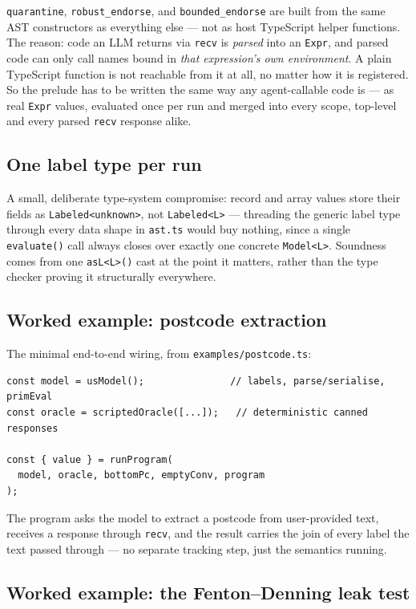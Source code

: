 \documentclass[11pt, a4paper]{article}
\begin{document}
\lstinline{quarantine}, \lstinline{robust_endorse}, and
\lstinline{bounded_endorse} are built from the same AST constructors as
everything else --- not as host TypeScript helper functions. The reason:
code an LLM returns via \lstinline{recv} is \emph{parsed} into an
\lstinline{Expr}, and parsed code can only call names bound in \emph{that
expression's own environment}. A plain TypeScript function is not
reachable from it at all, no matter how it is registered. So the prelude
has to be written the same way any agent-callable code is --- as real
\lstinline{Expr} values, evaluated once per run and merged into every
scope, top-level and every parsed \lstinline{recv} response alike.

\subsection{One label type per run}

A small, deliberate type-system compromise: record and array values store
their fields as \lstinline{Labeled<unknown>}, not \lstinline{Labeled<L>}
--- threading the generic label type through every data shape in
\texttt{ast.ts} would buy nothing, since a single \lstinline{evaluate()}
call always closes over exactly one concrete \lstinline{Model<L>}.
Soundness comes from one \lstinline{asL<L>()} cast at the point it
matters, rather than the type checker proving it structurally everywhere.

\subsection{Worked example: postcode extraction}

The minimal end-to-end wiring, from \texttt{examples/postcode.ts}:

\begin{lstlisting}
const model = usModel();               // labels, parse/serialise, primEval
const oracle = scriptedOracle([...]);   // deterministic canned responses

const { value } = runProgram(
  model, oracle, bottomPc, emptyConv, program
);
\end{lstlisting}

The program asks the model to extract a postcode from user-provided text,
receives a response through \lstinline{recv}, and the result carries the
join of every label the text passed through --- no separate tracking
step, just the semantics running.

\subsection{Worked example: the Fenton--Denning leak test}
\end{document}
